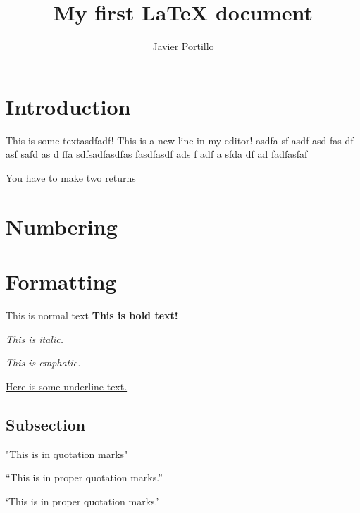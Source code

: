 \documentclass{article}
\author{Javier Portillo}
\title{My first {\LaTeX} document}
\begin{document}
\maketitle

\section{Introduction}

This is some textasdfadf!
This is a new line in my editor! asdfa sf asdf asd fas df asf safd as d ffa sdfsadfasdfas fasdfasdf ads f adf a sfda df ad fadfasfaf

You have to make two returns

\section{Numbering}

\section{Formatting}

This is normal text \textbf{This is bold text!}


\textit{This is italic.}

\emph{This is emphatic.}

\underline{Here is some underline text.}

\subsection{Subsection}

"This is in quotation marks"

``This is in proper quotation marks.''

`This is in proper quotation marks.'
\end{document}
